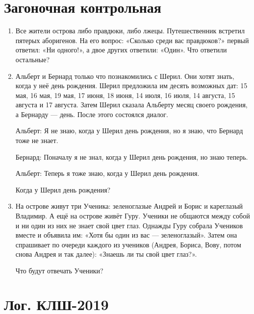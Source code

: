 \documentclass[12pt]{article}
\theoremstyle{definition}
\begin{document}
\section{Загоночная контрольная}

\begin{enumerate}
  \item Все жители острова либо правдюки, либо лжецы. Путешественник встретил пятерых аборигенов. 
  На его вопрос: «Сколько среди вас правдюков?» первый ответил: «Ни одного!», а двое других ответили: «Один». 
  Что ответили остальные?

  \item Альберт и Бернард только что познакомились с Шерил. Они хотят знать, когда у неё день рождения. 
  Шерил предложила им десять возможных дат: 15 мая, 16 мая, 19 мая, 17 июня, 18 июня, 14 июля, 16 июля, 14 августа, 15 августа и 17 августа. 
  Затем Шерил сказала Альберту месяц своего рождения, а Бернарду — день. После этого состоялся диалог.
  
  Альберт: Я не знаю, когда у Шерил день рождения, но я знаю, что Бернард тоже не знает.
  
  Бернард: Поначалу я не знал, когда у Шерил день рождения, но знаю теперь.
  
  Альберт: Теперь я тоже знаю, когда у Шерил день рождения. 
  
  Когда у Шерил день рождения?
  

  \item На острове живут три Ученика: зеленоглазые Андрей и Борис и кареглазый Владимир. А ещё на острове живёт Гуру.
  Ученики не общаются между собой и ни один из них не знает свой цвет глаз.
  Однажды Гуру собрала Учеников вместе и объявила им: «Хотя бы один из вас — зеленоглазый».
  Затем она спрашивает по очереди каждого из учеников (Андрея, Бориса, Вову, потом снова Андрея и так далее): 
  «Знаешь ли ты свой цвет глаз?».
  
  Что будут отвечать Ученики?


\end{enumerate}



\section{Лог. КЛШ-2019}
\end{document}
